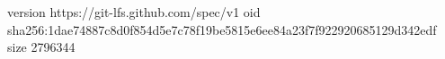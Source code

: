 version https://git-lfs.github.com/spec/v1
oid sha256:1dae74887c8d0f854d5e7c78f19be5815e6ee84a23f7f922920685129d342edf
size 2796344

